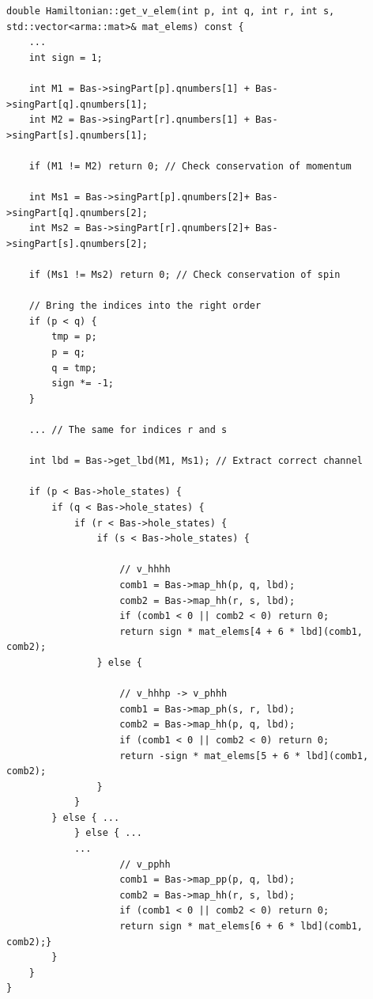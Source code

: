 \begin{lstlisting}[float, basicstyle=\footnotesize, caption={Function for accessing the v-elements. See text for detailed explanation.},label={lst:tp6}]
double Hamiltonian::get_v_elem(int p, int q, int r, int s, std::vector<arma::mat>& mat_elems) const {
    ...   
    int sign = 1;

    int M1 = Bas->singPart[p].qnumbers[1] + Bas->singPart[q].qnumbers[1];
    int M2 = Bas->singPart[r].qnumbers[1] + Bas->singPart[s].qnumbers[1];

    if (M1 != M2) return 0; // Check conservation of momentum

    int Ms1 = Bas->singPart[p].qnumbers[2]+ Bas->singPart[q].qnumbers[2];
    int Ms2 = Bas->singPart[r].qnumbers[2]+ Bas->singPart[s].qnumbers[2];

    if (Ms1 != Ms2) return 0; // Check conservation of spin
 
    // Bring the indices into the right order
    if (p < q) {
        tmp = p;
        p = q;
        q = tmp;
        sign *= -1;
    }

    ... // The same for indices r and s
  
    int lbd = Bas->get_lbd(M1, Ms1); // Extract correct channel

    if (p < Bas->hole_states) {
        if (q < Bas->hole_states) {
            if (r < Bas->hole_states) {
                if (s < Bas->hole_states) {
                
                    // v_hhhh
                    comb1 = Bas->map_hh(p, q, lbd);
                    comb2 = Bas->map_hh(r, s, lbd);
                    if (comb1 < 0 || comb2 < 0) return 0; 
                    return sign * mat_elems[4 + 6 * lbd](comb1, comb2);
                } else {
                
                    // v_hhhp -> v_phhh
                    comb1 = Bas->map_ph(s, r, lbd);
                    comb2 = Bas->map_hh(p, q, lbd);
                    if (comb1 < 0 || comb2 < 0) return 0;
                    return -sign * mat_elems[5 + 6 * lbd](comb1, comb2);
                }
            } 
        } else { ...
            } else { ...
            ...
                    // v_pphh
                    comb1 = Bas->map_pp(p, q, lbd);
                    comb2 = Bas->map_hh(r, s, lbd);
                    if (comb1 < 0 || comb2 < 0) return 0;
                    return sign * mat_elems[6 + 6 * lbd](comb1, comb2);}
        }
    } 
}
\end{lstlisting}

